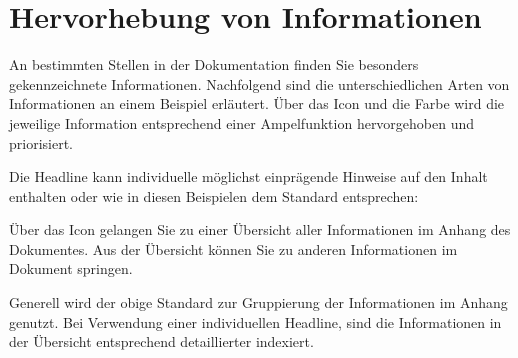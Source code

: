 \section{Hervorhebung von Informationen
}\label{sec:global-info}

An bestimmten Stellen in der Dokumentation finden Sie besonders gekennzeichnete Informationen.
Nachfolgend sind die unterschiedlichen Arten von Informationen an einem Beispiel erläutert.
Über das Icon und die Farbe wird die jeweilige Information entsprechend einer Ampelfunktion hervorgehoben und priorisiert.

Die Headline kann individuelle möglichst einprägende Hinweise auf den Inhalt enthalten oder
wie in diesen Beispielen dem Standard entsprechen:




Über das Icon gelangen Sie zu einer Übersicht aller Informationen im Anhang des Dokumentes.
Aus der Übersicht können Sie zu anderen Informationen im Dokument springen.

Generell wird der obige Standard zur Gruppierung der Informationen im Anhang genutzt.
Bei Verwendung einer individuellen Headline, sind die Informationen in der Übersicht entsprechend detaillierter indexiert.
